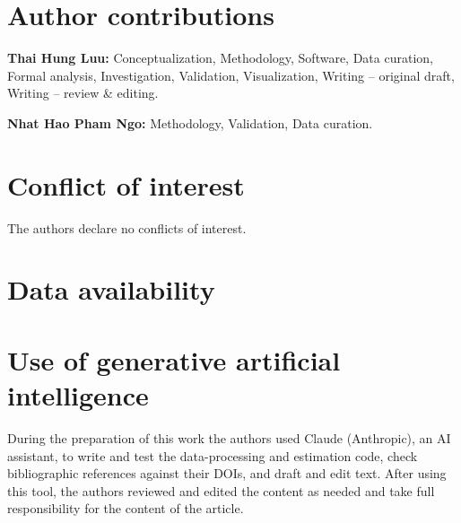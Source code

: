 \documentclass[11pt]{article}
\begin{document}
\section*{Author contributions}
\textbf{Thai Hung Luu:} Conceptualization, Methodology, Software, Data curation, Formal analysis,
Investigation, Validation, Visualization, Writing -- original draft, Writing -- review \& editing.\par
\noindent\textbf{Nhat Hao Pham Ngo:} Methodology, Validation, Data curation.

\section*{Conflict of interest}
The authors declare no conflicts of interest.

\section*{Data availability}


\section*{Use of generative artificial intelligence}
During the preparation of this work the authors used Claude (Anthropic), an AI assistant, to write
and test the data-processing and estimation code, check bibliographic references against their
DOIs, and draft and edit text. After using this tool, the authors reviewed and edited the content
as needed and take full responsibility for the content of the article.


{\raggedright} %

\clearpage
\appendix

\end{document}

